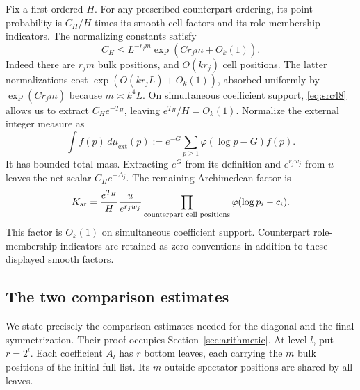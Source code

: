 Fix a first ordered $H$.  For any prescribed counterpart ordering,
its point probability is $C_H/H$ times its smooth cell factors and
its role-membership indicators.  The normalizing constants satisfy
\begin{equation}
                 C_H\le L^{-r_jm}\exp(Cr_jm+O_k(1)).
 \label{eq:construction-counterpart-mass}
\end{equation}
Indeed there are $r_jm$ bulk positions, and $O(kr_j)$ cell positions.
The latter normalizations cost $\exp(O(kr_jL)+O_k(1))$, absorbed
uniformly by $\exp(Cr_jm)$ because $m\asymp k^4L$.
On simultaneous coefficient support, \eqref{eq:src48} allows us to
extract $C_He^{-T_H}$, leaving $e^{T_H}/H=O_k(1)$.
Normalize the external integer measure as
\begin{equation}
       \int f(p)\,d\mu_{\mathrm{ext}}(p)
          :=e^{-G}\sum_{p\ge1}\varphi(\log p-G)f(p).
 \label{eq:construction-external-measure}
\end{equation}
It has bounded total mass.  Extracting $e^G$ from its definition
and $e^{r_jw_j}$ from $u$ leaves the net scalar
$C_He^{-\Delta_j}$.  The remaining Archimedean factor is
\[
 K_{\rm ar}
   =\frac{e^{T_H}}H\frac{u}{e^{r_jw_j}}
        \prod_{\text{counterpart cell positions}}
                           \varphi(\log p_i-c_i).
\]
This factor is $O_k(1)$ on simultaneous coefficient support.
Counterpart role-membership indicators are retained as zero
conventions in addition to these displayed smooth factors.

\subsection{The two comparison estimates}

We state precisely the comparison estimates needed for the diagonal
and the final symmetrization.  Their proof occupies
Section~\ref{sec:arithmetic}.  At level $l$, put $r=2^l$.
Each coefficient $A_l$ has $r$ bottom leaves, each carrying the
$m$ bulk positions of the initial full list.  Its $m$ outside
spectator positions are shared by all leaves.

